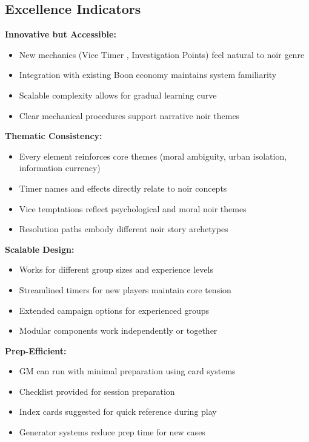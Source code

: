 \documentclass[11pt]{article}
\begin{document}
\subsection{Excellence Indicators}

\textbf{Innovative but Accessible:}
\begin{itemize}
\item New mechanics (Vice Timer , Investigation Points) feel natural to noir genre
\item Integration with existing Boon economy maintains system familiarity
\item Scalable complexity allows for gradual learning curve
\item Clear mechanical procedures support narrative noir themes
\end{itemize}

\textbf{Thematic Consistency:}
\begin{itemize}
\item Every element reinforces core themes (moral ambiguity, urban isolation, information currency)
\item Timer names and effects directly relate to noir concepts
\item Vice temptations reflect psychological and moral noir themes
\item Resolution paths embody different noir story archetypes
\end{itemize}

\textbf{Scalable Design:}
\begin{itemize}
\item Works for different group sizes and experience levels
\item Streamlined timers for new players maintain core tension
\item Extended campaign options for experienced groups
\item Modular components work independently or together
\end{itemize}

\textbf{Prep-Efficient:}
\begin{itemize}
\item GM can run with minimal preparation using card systems
\item Checklist provided for session preparation
\item Index cards suggested for quick reference during play
\item Generator systems reduce prep time for new cases
\end{itemize}
\end{document}
